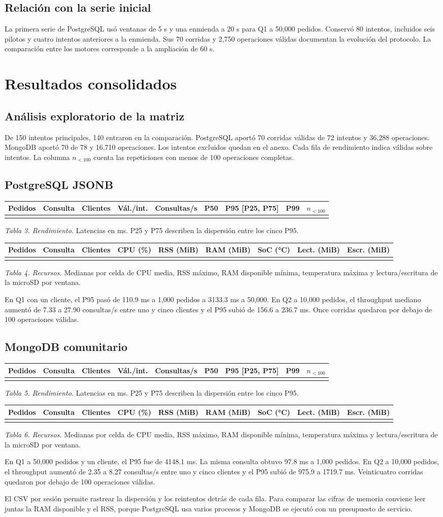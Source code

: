 \documentclass[10pt,a4paper]{article}
\makeatletter
\newcommand{\tablaMotor}[4]{%
\begin{center}
\small
\begin{tabular}{@{}rlrrrrrrr@{}}
\toprule
Pedidos & Consulta & Clientes & Vál./int. & Consultas/s & P50 & P95 [P25, P75] & P99 & $n_{<100}$\\
\midrule
#1
\bottomrule
\end{tabular}
\par\smallskip
\textit{Tabla #3. Rendimiento.} Latencias en ms. P25 y P75 describen la dispersión entre los cinco P95.
\par\medskip
\begin{tabular}{@{}rlrrrrrrr@{}}
\toprule
Pedidos & Consulta & Clientes & CPU (\%) & RSS (MiB) & RAM (MiB) & SoC (°C) & Lect. (MiB) & Escr. (MiB)\\
\midrule
#2
\bottomrule
\end{tabular}
\par\smallskip
\textit{Tabla #4. Recursos.} Medianas por celda de CPU media, RSS máximo, RAM disponible mínima, temperatura máxima y lectura/escritura de la microSD por ventana.
\end{center}
}
\makeatother
\begin{document}
\subsection{Relación con la serie inicial}
La primera serie de PostgreSQL usó ventanas de 5 s y una enmienda a 20 s para Q1 a 50,000 pedidos. Conservó 80 intentos, incluidos seis pilotos y cuatro intentos anteriores a la enmienda. Sus 70 corridas y 2,750 operaciones válidas documentan la evolución del protocolo. La comparación entre los motores corresponde a la ampliación de 60 s.

\clearpage
\section{Resultados consolidados}
\subsection{Análisis exploratorio de la matriz}
De 150 intentos principales, 140 entraron en la comparación. PostgreSQL aportó 70 corridas válidas de 72 intentos y 36,288 operaciones. MongoDB aportó 70 de 78 y 16,710 operaciones. Los intentos excluidos quedan en el anexo. Cada fila de rendimiento indica válidas sobre intentos. La columna $n_{<100}$ cuenta las repeticiones con menos de 100 operaciones completas.

\subsection{PostgreSQL JSONB}
\tablaMotor{\PgPerformance}{\PgResources}{3}{4}
En Q1 con un cliente, el P95 pasó de 110.9 ms a 1,000 pedidos a 3133.3 ms a 50,000. En Q2 a 10,000 pedidos, el throughput mediano aumentó de 7.33 a 27.90 consultas/s entre uno y cinco clientes y el P95 subió de 156.6 a 236.7 ms. Once corridas quedaron por debajo de 100 operaciones válidas.

\clearpage
\subsection{MongoDB comunitario}
\tablaMotor{\MongoPerformance}{\MongoResources}{5}{6}
En Q1 a 50,000 pedidos y un cliente, el P95 fue de 4148.1 ms. La misma consulta obtuvo 97.8 ms a 1,000 pedidos. En Q2 a 10,000 pedidos, el throughput aumentó de 2.35 a 8.27 consultas/s entre uno y cinco clientes y el P95 subió de 975.9 a 1719.7 ms. Veinticuatro corridas quedaron por debajo de 100 operaciones válidas.

El CSV por sesión permite rastrear la dispersión y los reintentos detrás de cada fila. Para comparar las cifras de memoria conviene leer juntas la RAM disponible y el RSS, porque PostgreSQL usa varios procesos y MongoDB se ejecutó con un presupuesto de servicio.
\end{document}
